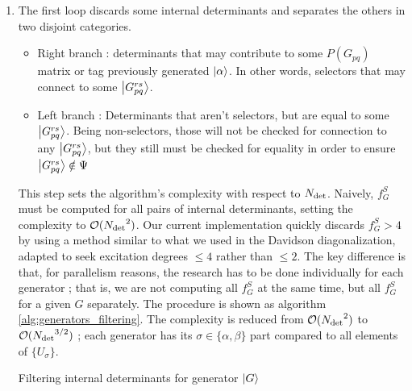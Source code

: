 \documentclass[./thesis.tex]{subfiles}
\begin{document}
\begin{enumerate}

\item
The first loop discards some internal determinants and separates the others in two disjoint categories.


\begin{itemize}
\item
Right branch : determinants that may contribute to some $P(G_{pq})$ matrix or tag previously generated $\ket \alpha$. In other words, selectors that may connect to some $\ket {G_{pq}^{rs}}$. 

\item
Left branch : Determinants that aren't selectors, but are equal to some $\ket {G_{pq}^{rs}}$. Being non-selectors, those will not be checked for connection to any $\ket {G_{pq}^{rs}}$, but they still must be checked for equality in order to ensure $\ket {G_{pq}^{rs}} \notin \Psi$
\end{itemize}

This step sets the algorithm's complexity with respect to ${N_\text{det}}$. Naively, $f_G^S$ must be computed for all pairs of internal determinants, setting the complexity to $\mathcal{O}({N_\text{det}}^2)$. Our current implementation quickly discards $f_G^S > 4$ by using a method similar to what we used in the Davidson diagonalization, adapted to seek excitation degrees $\leq 4$ rather than $\leq 2$. The key difference is that, for parallelism reasons, the research has to be done individually for each generator ; that is, we are not computing all $f_G^S$ at the same time, but all $f_G^S$ for a given $G$ separately. The procedure is shown as algorithm \ref{alg:generators_filtering}. The complexity is reduced from $\mathcal{O}({N_\text{det}}^2)$ to $\mathcal{O}({N_\text{det}}^{3/2})$ ; each generator has its $\sigma \in \{\alpha, \beta\}$ part compared to all elements of $\{U_\sigma\}$.


\begin{algorithm}
\caption{Filtering internal determinants for generator $\ket G$}
\label{alg:generators_filtering}

\end{algorithm}




\end{enumerate}
\end{document}
